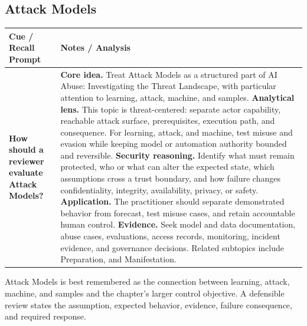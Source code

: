 \documentclass[11pt]{article}
\newcommand{\CornellHeader}{%
\rowcolor{Navy}\color{white}\bfseries Cue / Recall Prompt & \color{white}\bfseries Notes / Analysis\\\hline}
\newcommand{\CornellRow}[2]{%
\cellcolor{CueGray}\RaggedRight\textbf{#1} & \RaggedRight #2\\\hline}
\begin{document}
\subsection*{Attack Models}
\begin{longtable}{>{\RaggedRight\arraybackslash}p{}|>{\RaggedRight\arraybackslash}p{}}
\CornellHeader
\CornellRow{How should a reviewer evaluate Attack Models?}{\textbf{Core idea.} Treat Attack Models as a structured part of AI Abuse: Investigating the Threat Landscape, with particular attention to learning, attack, machine, and samples. \textbf{Analytical lens.} This topic is threat-centered: separate actor capability, reachable attack surface, prerequisites, execution path, and consequence. For learning, attack, and machine, test misuse and evasion while keeping model or automation authority bounded and reversible. \textbf{Security reasoning.} Identify what must remain protected, who or what can alter the expected state, which assumptions cross a trust boundary, and how failure changes confidentiality, integrity, availability, privacy, or safety. \textbf{Application.} The practitioner should separate demonstrated behavior from forecast, test misuse cases, and retain accountable human control. \textbf{Evidence.} Seek model and data documentation, abuse cases, evaluations, access records, monitoring, incident evidence, and governance decisions. Related subtopics include Preparation, and Manifestation.}
\end{longtable}
\begin{topicsummary}
Attack Models is best remembered as the connection between learning, attack, machine, and samples and the chapter's larger control objective. A defensible review states the assumption, expected behavior, evidence, failure consequence, and required response.
\end{topicsummary}
\end{document}
